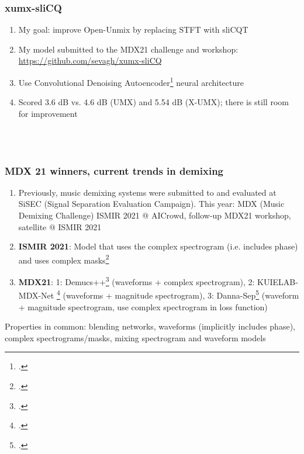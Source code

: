 \documentclass[usenames,dvipsnames]{beamer}
\begin{document}
\begin{frame}
	\frametitle{xumx-sliCQ}
	\begin{enumerate}
		\item
			My goal: improve Open-Unmix by replacing STFT with sliCQT
		\item
			My model submitted to the MDX21 challenge and workshop: \url{https://github.com/sevagh/xumx-sliCQ}
		\item
			Use Convolutional Denoising Autoencoder\footcite{plumbley1, plumbley2} neural architecture
		\item
			Scored 3.6 dB vs. 4.6 dB (UMX) and 5.54 dB (X-UMX); there is still room for improvement
	\end{enumerate}
	\begin{figure}[ht]
		\centering
		\vspace{-1.15em}
		\\
		\vspace{-0.5em}
		\\
		\vspace{-0.5em}
	\end{figure}
\end{frame}

\begin{frame}
	\frametitle{MDX 21 winners, current trends in demixing}
	\begin{enumerate}
		\item
			Previously, music demixing systems were submitted to and evaluated at SiSEC (Signal Separation Evaluation Campaign). This year: MDX (Music Demixing Challenge) ISMIR 2021 @ AICrowd, follow-up MDX21 workshop, satellite @ ISMIR 2021
		\item
			\textbf{ISMIR 2021}: Model that uses the complex spectrogram (i.e. includes phase) and uses complex masks\footcite{kong2021decoupling}
		\item
			\textbf{MDX21}: 1: Demucs++\footcite{demucsplus} (waveforms + complex spectrogram), 2: KUIELAB-MDX-Net \footcite{choi2021} (waveforms + magnitude spectrogram), 3: Danna-Sep\footcite{dannasep} (waveform + magnitude spectrogram, use complex spectrogram in loss function)
	\end{enumerate}
	Properties in common: blending networks, waveforms (implicitly includes phase), complex spectrograms/masks, mixing spectrogram and waveform models
\end{frame}
\end{document}
